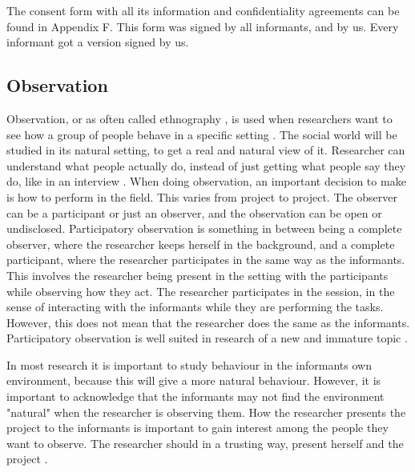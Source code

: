 The consent form with all its information and confidentiality agreements can be found in Appendix F. This form was signed by all informants, and by us. Every informant got a version signed by us. 

\subsection{Observation}
\label{subsec:observation}
Observation, or as often called ethnography \cite{tjora}, is used when researchers want to see how a group of people behave in a specific setting \cite{qualitative}. The social world will be studied in its natural setting, to get a real and natural view of it. Researcher can understand what people actually do, instead of just getting what people say they do, like in an interview \cite{tjora}. When doing observation, an important decision to make is how to perform in the field. This varies from project to project. The observer can be a participant or just an observer, and the observation can be open or undisclosed. Participatory observation is something in between being a complete observer, where the researcher keeps herself in the background, and a complete participant, where the researcher participates in the same way as the informants. This involves the researcher being present in the setting with the participants while observing how they act. The researcher participates in the session, in the sense of interacting with the informants while they are performing the tasks. However, this does not mean that the researcher does the same as the informants. Participatory observation is well suited in research of a new and immature topic \cite{qualitative}.

In most research it is important to study behaviour in the informants own environment, because this will give a more natural behaviour. However, it is important to acknowledge that the informants may not find the environment "natural" when the researcher is observing them. How the researcher presents the project to the informants is important to gain interest among the people they want to observe. The researcher should in a trusting way, present herself and the project \cite{qualitative}.


